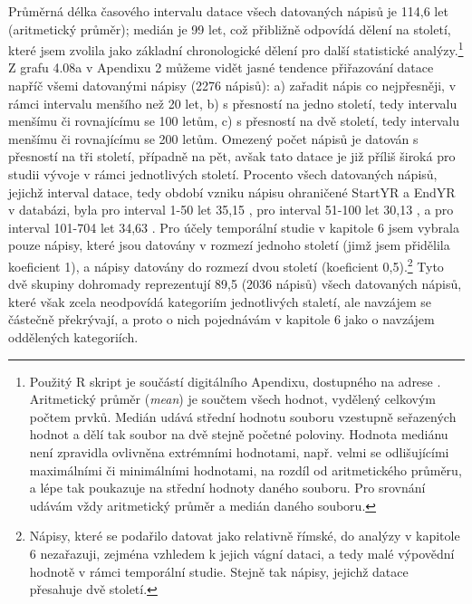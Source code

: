 Průměrná délka časového intervalu datace všech datovaných nápisů je 114,6 let (aritmetický průměr); medián je 99 let, což přibližně odpovídá dělení na století, které jsem zvolila jako základní chronologické dělení pro další statistické analýzy.\footnote{Použitý R skript je součástí digitálního Apendixu, dostupného na adrese \from[url18]. Aritmetický průměr ({\em mean}) je součtem všech hodnot, vydělený celkovým počtem prvků. Medián udává střední hodnotu souboru vzestupně seřazených hodnot a dělí tak soubor na dvě stejně početné poloviny. Hodnota mediánu není zpravidla ovlivněna extrémními hodnotami, např. velmi se odlišujícími maximálními či minimálními hodnotami, na rozdíl od aritmetického průměru, a lépe tak poukazuje na střední hodnoty daného souboru. Pro srovnání udávám vždy aritmetický průměr a medián daného souboru.} Z grafu 4.08a v Apendixu 2 můžeme vidět jasné tendence přiřazování datace napříč všemi datovanými nápisy (2276 nápisů): a) zařadit nápis co nejpřesněji, v rámci intervalu menšího než 20 let, b) s přesností na jedno století, tedy intervalu menšímu či rovnajícímu se 100 letům, c) s přesností na dvě století, tedy intervalu menšímu či rovnajícímu se 200 letům. Omezený počet nápisů je datován s přesností na tři století, případně na pět, avšak tato datace je již příliš široká pro studii vývoje v rámci jednotlivých století. Procento všech datovaných nápisů, jejichž interval datace, tedy období vzniku nápisu ohraničené StartYR a EndYR v databázi, byla pro interval 1-50 let 35,15 , pro interval 51-100 let 30,13 , a pro interval 101-704 let 34,63 . Pro účely temporální studie v kapitole 6 jsem vybrala pouze nápisy, které jsou datovány v rozmezí jednoho století (jimž jsem přidělila koeficient 1), a nápisy datovány do rozmezí dvou století (koeficient 0,5).\footnote{Nápisy, které se podařilo datovat jako relativně římské, do analýzy v kapitole 6 nezařazuji, zejména vzhledem k jejich vágní dataci, a tedy malé výpovědní hodnotě v rámci temporální studie. Stejně tak nápisy, jejichž datace přesahuje dvě století.} Tyto dvě skupiny dohromady reprezentují 89,5  (2036 nápisů) všech datovaných nápisů, které však zcela neodpovídá kategoriím jednotlivých staletí, ale navzájem se částečně překrývají, a proto o nich pojednávám v kapitole 6 jako o navzájem oddělených kategoriích.

